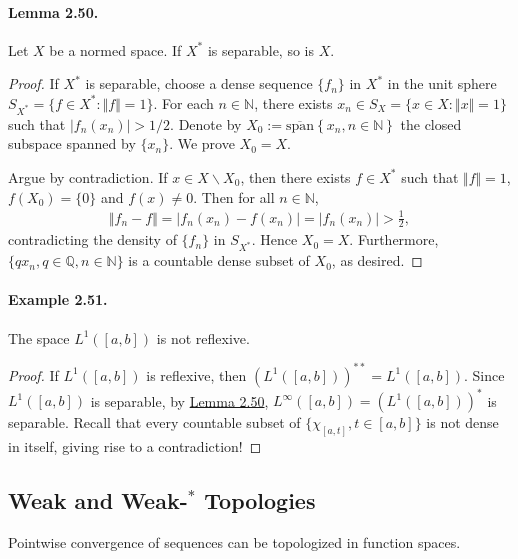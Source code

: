 \documentclass{article}
\begin{document}
\paragraph{Lemma 2.50.\label{lemma:2.50}} Let $X$ be a normed space. If $X^*$ is separable, so is $X$.
\begin{proof}
If $X^*$ is separable, choose a dense sequence $\{f_n\}$ in $X^*$ in the unit sphere $S_{X^*}=\{f\in X^*:\Vert f\Vert=1\}$. For each $n\in\mathbb{N}$, there exists $x_n\in S_X=\{x\in X:\Vert x\Vert=1\}$ such that $\vert f_n(x_n)\vert > 1/2$. Denote by $X_0:=\overline{\mathrm{span}}\left\{x_n,n\in\mathbb{N}\right\}$ the closed subspace spanned by $\{x_n\}$. We prove $X_0=X$.

Argue by contradiction. If $x\in X\backslash X_0$, then there exists $f\in X^*$ such that $\Vert f\Vert=1$, $f(X_0)=\{0\}$ and $f(x) \neq 0$. Then for all $n\in\mathbb{N}$,
\begin{align*}
	\Vert f_n - f\Vert = \vert f_n(x_n)-f(x_n)\vert = \vert f_n(x_n)\vert > \frac{1}{2},
\end{align*}
contradicting the density of $\{f_n\}$ in $S_{X^*}$. Hence $X_0=X$. Furthermore, $\{qx_n,q\in\mathbb{Q},n\in\mathbb{N}\}$ is a countable dense subset of $X_0$, as desired.
\end{proof}

\paragraph{Example 2.51.\label{example:2.51}} The space $L^1([a,b])$ is not reflexive.
\begin{proof}
If $L^1([a,b])$ is reflexive, then $(L^1([a,b]))^{**}= L^1([a,b])$. Since $L^1([a,b])$ is separable, by \hyperref[lemma:2.50]{Lemma 2.50}, $L^\infty([a,b])=(L^1([a,b]))^*$ is separable. Recall that every countable subset of $\{\chi_{[a,t]},t\in[a,b]\}$ is not dense in itself, giving rise to a contradiction!
\end{proof}

\newpage
\subsection{Weak and Weak-$^*$ Topologies}
Pointwise convergence of sequences can be topologized in function spaces.
\end{document}
